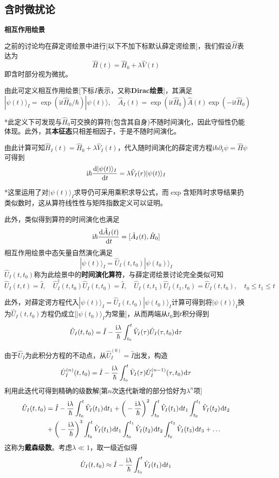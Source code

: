 \documentclass[a4paper,UTF8,fontset=windows]{ctexart}
\newcommand*{\dr}{\hspace{0.07em}\mathrm{d}}
\newcommand*{\ir}{\mathrm{i}}
\newcommand*{\ket}[1]{|#1\rangle}
\begin{document}
\subsection{含时微扰论}
\textbf{相互作用绘景}

之前的讨论均在薛定谔绘景中进行[以下不加下标默认薛定谔绘景]，我们假设$\hat{H}$表达为
$$\hat{H}(t)=\hat{H}_0+\lambda\hat{V}(t)$$
即含时部分视为微扰。

由此可定义相互作用绘景[下标$I$表示，又称\textbf{Dirac绘景}]，其满足
$$\ket{\psi(t)}_I=\exp(\ir t\hat{H}_0/\hbar)\ket{\psi(t)},\quad\hat{A}_I(t)=\exp(\ir t\hat{H}_0)\hat{A}(t)\exp(-\ir t\hat{H}_0)$$

*此定义下可发现与$\hat{H}_0$可交换的算符(包含其自身)不随时间演化，因此守恒性仍能体现。此外，其\textbf{本征态}只相差相因子，于是不随时间演化。

由此计算可知$\hat{H}_I(t)=\hat{H}_0+\lambda\hat{V}_I(t)$，代入随时间演化的薛定谔方程$\ir\hbar\partial_t\psi=\hat{H}\psi$可得到
$$\ir\hbar\frac{\dr\ket{\psi(t)}_I}{\dr t}=\lambda\hat{V}_I(r)\ket{\psi(t)}_I$$

*这里运用了对$\ket{\psi(t)}_I$求导仍可采用乘积求导公式，而$\exp$含矩阵时求导结果扔类似数时，这从算符线性性与矩阵指数定义可以证明。

此外，类似得到算符的时间演化也满足
$$\ir\hbar\frac{\dr\hat{A}_I(t)}{\dr t}=[\hat{A}_I(t),\hat{H}_0]$$
相互作用绘景中态矢量自然演化满足
$$\ket{\psi(t)}_I=\hat{U}_I(t,t_0)\ket{\psi(t_0)}_I$$
$\hat{U}_I(t,t_0)$称为此绘景中的\textbf{时间演化算符}，与薛定谔绘景讨论完全类似可知
$$\hat{U}_I(t,t)=\hat{I},\quad\hat{U}_I^\dagger(t,t_0)\hat{U}_I(t,t_0)=\hat{I},\quad\hat{U}_I(t,t_1)\hat{U}_I(t_1,t_0)=\hat{U}_I(t,t_0),\quad t_0\le t_1\le t$$

此外，对薛定谔方程代入$\ket{\psi(t)}_I=\hat{U}_I(t,t_0)\ket{\psi(t_0)}_I$计算可得到将$\ket{\psi(t)}_I$换为$\hat{U}_I(t,t_0)$方程仍成立[$\ket{\psi(t_0)}_I$为常量]，从而两端从$t_0$到$t$积分得到
$$\hat{U}_I(t,t_0)=\hat{I}-\frac{\ir\lambda}{\hbar}\int_{t_0}^t\hat{V}_I(\tau)\hat{U}_I(\tau,t_0)\dr\tau$$

由于$\hat{U}_I$为此积分方程的不动点，从$\hat{U}_I^{(0)}=\hat{I}$出发，构造
$$\hat{U}_I^{(n)}(t,t_0)=\hat{I}-\frac{\ir\lambda}{\hbar}\int_{t_0}^t\hat{V}_I(\tau)\hat{U}_I^{(n-1)}(\tau,t_0)\dr\tau$$
利用此迭代可得到精确的级数解[第$n$次迭代新增的部分恰好为$\lambda^n$项]
$$\begin{aligned}\hat{U}_I(t,t_0)&=\hat{I}-\frac{\ir\lambda}{\hbar}\int_{t_0}^t\hat{V}_I(t_1)\dr t_1+\bigg(-\frac{\ir\lambda}{\hbar}\bigg)^2\int_{t_0}^{t}\hat{V}_I(t_1)\dr t_1\int_{t_0}^{t_1}\hat{V}_I(t_2)\dr t_2\\ &+\bigg(-\frac{\ir\lambda}{\hbar}\bigg)^3\int_{t_0}^{t}\hat{V}_I(t_1)\dr t_1\int_{t_0}^{t_1}\hat{V}_I(t_2)\dr t_2\int_{t_0}^{t_2}\hat{V}_I(t_3)\dr t_3+\dots\end{aligned}$$
这称为\textbf{戴森级数}。考虑$\lambda\ll1$，取一级近似得
$$\hat{U}_I(t,t_0)\approx\hat{I}-\frac{\ir\lambda}{\hbar}\int_{t_0}^t\hat{V}_I(t_1)\dr t_1$$
\end{document}
